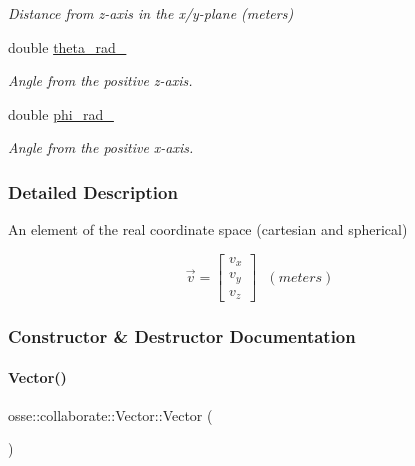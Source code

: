 \begin{DoxyCompactItemize}
\begin{DoxyCompactList}\small\item\em Distance from z-\/axis in the x/y-\/plane (meters) \end{DoxyCompactList}\item 
\mbox{\label{classosse_1_1collaborate_1_1_vector_aa6d88c9293f3b75c387ccf88cb8cd1de}} 
double \hyperlink{classosse_1_1collaborate_1_1_vector_aa6d88c9293f3b75c387ccf88cb8cd1de}{theta\+\_\+rad\+\_\+}
\begin{DoxyCompactList}\small\item\em Angle from the positive z-\/axis. \end{DoxyCompactList}\item 
\mbox{\label{classosse_1_1collaborate_1_1_vector_a7d1e83ec48925e32d614617bfe31223e}} 
double \hyperlink{classosse_1_1collaborate_1_1_vector_a7d1e83ec48925e32d614617bfe31223e}{phi\+\_\+rad\+\_\+}
\begin{DoxyCompactList}\small\item\em Angle from the positive x-\/axis. \end{DoxyCompactList}\end{DoxyCompactItemize}


\subsubsection{Detailed Description}
An element of the real coordinate space (cartesian and spherical) 

\[ \vec{v} = \begin{bmatrix} v_x\\v_y\\v_z \end{bmatrix} ~~~(meters) \] 

\subsubsection{Constructor \& Destructor Documentation}
\mbox{\label{classosse_1_1collaborate_1_1_vector_af495b2efd099a897642ec06be87abc16}} 
\paragraph{\texorpdfstring{Vector()}{Vector()}\hspace{0.1cm}{\footnotesize\ttfamily [1/2]}}
{\footnotesize\ttfamily osse\+::collaborate\+::\+Vector\+::\+Vector (\begin{DoxyParamCaption}{ }\end{DoxyParamCaption})}



